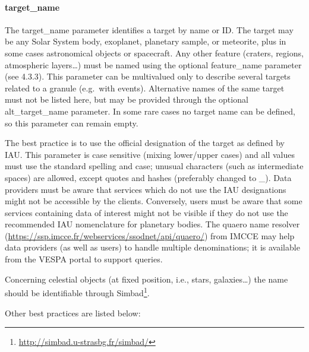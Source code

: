 \documentclass[11pt,a4paper]{ivoa}
\begin{document}
\paragraph{target\_name}

The target\_name parameter identifies a target by name or ID. The
target may be any Solar System body, exoplanet, planetary sample, or
meteorite, plus in some cases astronomical objects or spacecraft. Any
other feature (craters, regions, atmospheric layers\dots) must be named
using the optional feature\_name parameter (see 4.3.3). This parameter
can be multivalued only to describe several targets related to a granule
(e.g.\ with events). Alternative names of the same target must not be
listed here, but may be provided through the optional alt\_target\_name
parameter. In some rare cases no target name can be defined, so this
parameter can remain empty.

The best practice is to use the official designation of the target as
defined by IAU. This parameter is case sensitive (mixing lower/upper
cases) and all values must use the standard spelling and case; unusual
characters (such as intermediate spaces) are allowed, except quotes
and hashes (preferably changed to \_).
Data providers must be aware that services
which do not use the IAU designations might not be accessible by the
clients. Conversely, users must be aware that some services containing
data of interest might not be visible if they do not use the recommended
IAU nomenclature for planetary bodies. The quaero name resolver
(\url{https://ssp.imcce.fr/webservices/ssodnet/api/quaero/})
from IMCCE may help data providers (as well as users) to handle multiple
denominations; it is available from the VESPA portal to support queries.

Concerning celestial objects (at fixed position, i.e., stars,
galaxies…) the name should be identifiable through
Simbad\footnote{\url{http://simbad.u-strasbg.fr/simbad/}}.

Other best practices are listed below:
\end{document}
